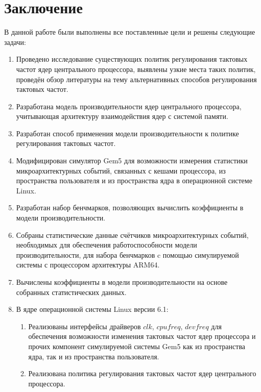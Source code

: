 \section{Заключение}
\label{sec:Section5} 

    В данной работе были выполнены все поставленные цели и решены следующие задачи:
    \begin{enumerate}
        \item Проведено исследование существующих политик регулирования тактовых частот ядер
        центрального процессора, выявлены узкие места таких политик, проведён обзор литературы на тему
        альтернативных способов регулирования тактовых частот.
        \item Разработана модель производительности ядер центрального процессора, учитывающая архитектуру
        взаимодействия ядер с системой памяти.
        \item Разработан способ применения модели производительности к политике регулирования тактовых частот.
        \item Модифицирован симулятор Gem5 для возможности измерения статистики микроархитектурных событий,
        связанных с кешами процессора, из пространства пользователя и из пространства ядра в операционной
        системе Linux.
        \item Разработан набор бенчмарков, позволяющих вычислить коэффициенты в модели производительности.
        \item Собраны статистические данные счётчиков микроархитектурных событий, необходимых для обеспечения
        работоспособности модели производительности, для набора бенчмарков c помощью симулируемой системы с
        процессором архитектуры ARM64.
        \item Вычислены коэффициенты в модели производительности на основе собранных статистических данных.
        \item В ядре операционной системы Linux версии 6.1:
        \begin{enumerate}
            \item Реализованы интерфейсы драйверов $clk$, $cpufreq$, $devfreq$ для обеспечения возможности
            изменения тактовых частот ядер процессора и прочих компонент симулируемой системы Gem5
            как из пространства ядра, так и из пространства пользователя.
            \item Реализована политика регулирования тактовых частот ядер центрального процессора.
        \end{enumerate}
    \end{enumerate}

